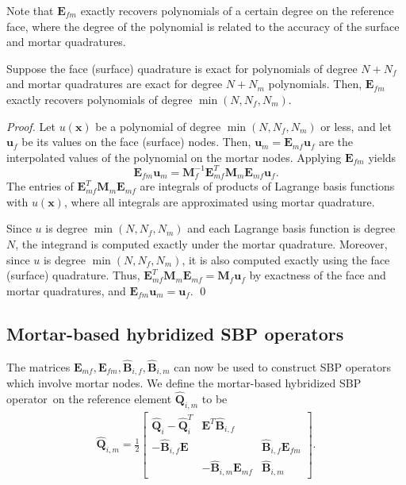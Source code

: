 \documentclass{svjour3}                     %
\renewcommand{\hat}{\widehat}
\begin{document}
Note that $\bm{E}_{fm}$ exactly recovers polynomials of a certain degree on the reference face, where the degree of the polynomial is related to the accuracy of the surface and mortar quadratures.
\begin{lemma}
\label{lemma:Efm}
Suppose the face (surface) quadrature is exact for polynomials of degree $N+N_f$ and mortar quadratures are exact for degree $N+N_m$ polynomials.  Then, $\bm{E}_{fm}$ exactly recovers polynomials of degree $\min(N,N_f,N_m)$.
\end{lemma}
\begin{proof}
Let $u(\bm{x})$ be a polynomial of degree $\min(N,N_f,N_m)$ or less, and let $\bm{u}_f$ be its values on the face (surface) nodes.  Then, $\bm{u}_m = \bm{E}_{mf}\bm{u}_f$ are the interpolated values of the polynomial on the mortar nodes.  Applying $\bm{E}_{fm}$ yields
\[
\bm{E}_{fm}\bm{u}_m = \bm{M}_f^{-1}\bm{E}_{mf}^T\bm{M}_m\bm{E}_{mf}\bm{u}_f.
\]
The entries of $\bm{E}_{mf}^T\bm{M}_m\bm{E}_{mf}$ are integrals of products of Lagrange basis functions with $u(\bm{x})$, where all integrals are approximated using mortar quadrature.  

Since $u$ is degree $\min(N,N_f,N_m)$ and each Lagrange basis function is degree $N$, the integrand is computed exactly under the mortar quadrature.  Moreover, since $u$ is degree $\min(N,N_f,N_m)$, it is also computed exactly using the face (surface) quadrature.  Thus, $\bm{E}_{mf}^T\bm{M}_m\bm{E}_{mf} = \bm{M}_f \bm{u}_f$ by exactness of the face and mortar quadratures, and $\bm{E}_{fm}\bm{u}_m = \bm{u}_f$.
\qed\end{proof}

\subsection{Mortar-based hybridized SBP operators}

The matrices $\bm{E}_{mf}, \bm{E}_{fm}, \hat{\bm{B}}_{i,f}, \hat{\bm{B}}_{i,m}$ can now be used to construct SBP operators which involve mortar nodes.  We define the mortar-based hybridized SBP operator on the reference element $\hat{\bm{Q}}_{i,m}$ to be
\begin{align}
\hat{\bm{Q}}_{i,m} = \frac{1}{2}\begin{bmatrix}
\hat{\bm{Q}}_i - \hat{\bm{Q}}_i^T & \bm{E}^T\hat{\bm{B}}_{i,f} & \\
-\hat{\bm{B}}_{i,f}\bm{E} & & \hat{\bm{B}}_{i,f} \bm{E}_{fm}\\
& -\hat{\bm{B}}_{i,m} \bm{E}_{mf} & \hat{\bm{B}}_{i,m}
\end{bmatrix}.
\label{eq:mhsbp}
\end{align}
\end{document}
